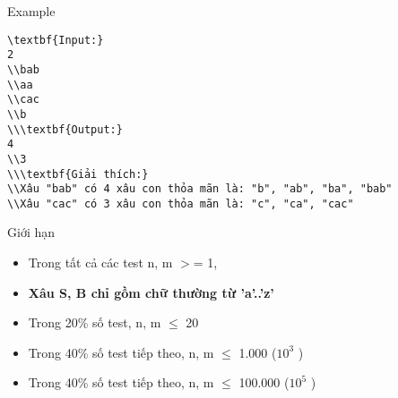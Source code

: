 Example  
\begin{verbatim}
\textbf{Input:}
2
\\bab
\\aa
\\cac
\\b
\\\textbf{Output:}
4
\\3
\\\textbf{Giải thích:}
\\Xâu "bab" có 4 xâu con thỏa mãn là: "b", "ab", "ba", "bab"
\\Xâu "cac" có 3 xâu con thỏa mãn là: "c", "ca", "cac" \end{verbatim}
   Giới hạn  
\begin{itemize}
	\item     Trong tất cả các test n, m $>$= 1,   
	\item \textbf{     Xâu S, B chỉ gồm chữ thường từ 'a'..'z'    }
	\item     Trong 20\% số test, n, m  $\le$  20   
	\item     Trong 40\% số test tiếp theo, n, m  $\le$  1.000 ($10^{3}$    )   
	\item     Trong 40\% số test tiếp theo, n, m  $\le$  100.000 ($10^{5}$    )   
\end{itemize}